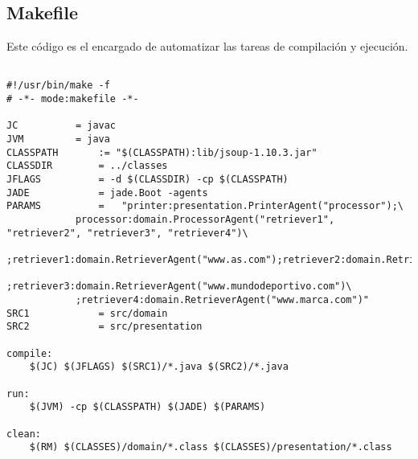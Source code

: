 \documentclass{pre-tfg}
\begin{document}
\subsection{Makefile}

Este código es el encargado de automatizar las tareas de compilación y ejecución.

\begin{lstlisting}[caption=Código que automatiza la tarea de compilación y ejecución,style=makefile]

#!/usr/bin/make -f
# -*- mode:makefile -*-

JC 			= javac
JVM			= java
CLASSPATH		:= "$(CLASSPATH):lib/jsoup-1.10.3.jar"
CLASSDIR 		= ../classes
JFLAGS 			= -d $(CLASSDIR) -cp $(CLASSPATH)
JADE 			= jade.Boot -agents
PARAMS 			= 	"printer:presentation.PrinterAgent("processor");\
			processor:domain.ProcessorAgent("retriever1", "retriever2", "retriever3", "retriever4")\
			;retriever1:domain.RetrieverAgent("www.as.com");retriever2:domain.RetrieverAgent("www.sports.es")\
			;retriever3:domain.RetrieverAgent("www.mundodeportivo.com")\
			;retriever4:domain.RetrieverAgent("www.marca.com")" 
SRC1 			= src/domain
SRC2			= src/presentation

compile:
	$(JC) $(JFLAGS) $(SRC1)/*.java $(SRC2)/*.java

run:
	$(JVM) -cp $(CLASSPATH) $(JADE) $(PARAMS)

clean:
	$(RM) $(CLASSES)/domain/*.class $(CLASSES)/presentation/*.class

\end{lstlisting}

\clearpage


\singlespacing

\end{document}
